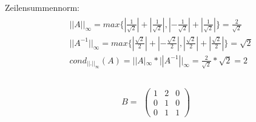 Zeilensummennorm:
\begin{align*}
\begin{split}
&||A||_\infty =max\{|\frac{1}{\sqrt2}|+|\frac{1}{\sqrt2}|, |-\frac{1}{\sqrt2}|+|\frac{1}{\sqrt2}|\}=\frac{2}{\sqrt2}\\
&||A^{-1}||_\infty=max\{|\frac{\sqrt2}{2}|+|-\frac{\sqrt2}{2}|, |\frac{\sqrt2}{2}|+|\frac{\sqrt2}{2}|\}={\sqrt2}\\
& cond_{||.||_\infty}(A)=||A|_\infty*||A^{-1}||_\infty=\frac{2}{\sqrt2} * {\sqrt2} = 2\\
\end{split}
\end{align*}

\begin{align*} 
B=
\begin{split}
\begin{pmatrix}
1 & 2 & 0 \\
0 & 1 & 0 \\
0 & 1 & 1
\end{pmatrix}
\end{split}
\end{align*}
